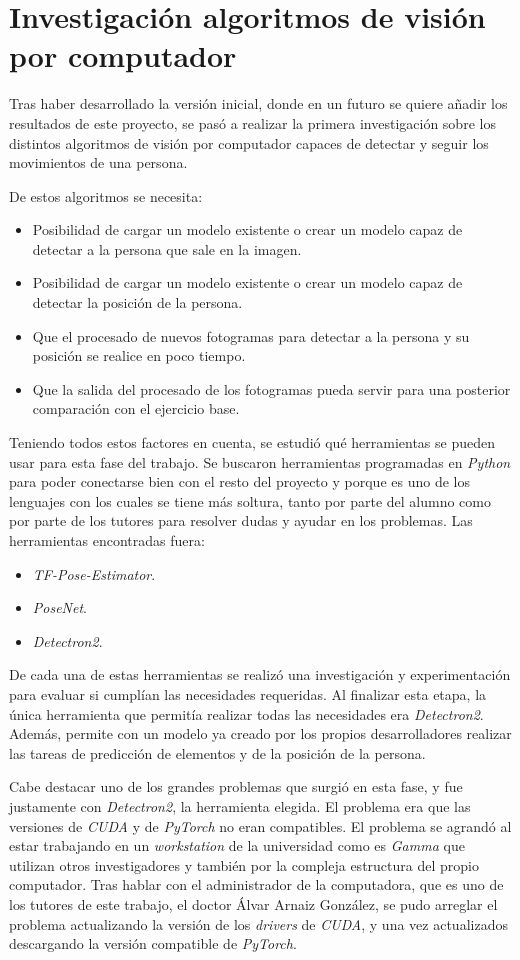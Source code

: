 {\section{Investigación algoritmos de visión por computador} \label{aspc}
Tras haber desarrollado la versión inicial, donde en un futuro se quiere añadir los resultados de este proyecto, se pasó a realizar la primera investigación sobre los distintos algoritmos de visión por computador capaces de detectar y seguir los movimientos de una persona. 

De estos algoritmos se necesita:
\begin{itemize}
	\item Posibilidad de cargar un modelo existente o crear un modelo capaz de detectar a la persona que sale en la imagen.
	\item Posibilidad de cargar un modelo existente o crear un modelo capaz de detectar la posición de la persona.
	\item Que el procesado de nuevos fotogramas para detectar a la persona y su posición se realice en poco tiempo.
	\item Que la salida del procesado de los fotogramas pueda servir para una posterior comparación con el ejercicio base.
\end{itemize}

Teniendo todos estos factores en cuenta, se estudió qué herramientas se pueden usar para esta fase del trabajo. Se buscaron herramientas programadas en \textit{Python} para poder conectarse bien con el resto del proyecto y porque es uno de los lenguajes con los cuales se tiene más soltura, tanto por parte del alumno como por parte de los tutores para resolver dudas y ayudar en los problemas. Las herramientas encontradas fuera:
\begin{itemize}
	\item \textit{TF-Pose-Estimator}.
	\item \textit{PoseNet}.
	\item \textit{Detectron2}.
\end{itemize}

De cada una de estas herramientas se realizó una investigación y experimentación para evaluar si cumplían las necesidades requeridas. Al finalizar esta etapa, la única herramienta que permitía realizar todas las necesidades era \textit{Detectron2}. Además, permite con un modelo ya creado por los propios desarrolladores realizar las tareas de predicción de elementos y de la posición de la persona.

Cabe destacar uno de los grandes problemas que surgió en esta fase, y fue justamente con \textit{Detectron2}, la herramienta elegida. El problema era que las versiones de \textit{CUDA} y de \textit{PyTorch} no eran compatibles. El problema se agrandó al estar trabajando en un \textit{workstation} de la universidad como es \textit{Gamma} que utilizan otros investigadores y también por la compleja estructura del propio computador. Tras hablar con el administrador de la computadora, que es uno de los tutores de este trabajo, el doctor Álvar Arnaiz González, se pudo arreglar el problema actualizando la versión de los \textit{drivers} de \textit{CUDA}, y una vez actualizados descargando la versión compatible de \textit{PyTorch}. 
}
